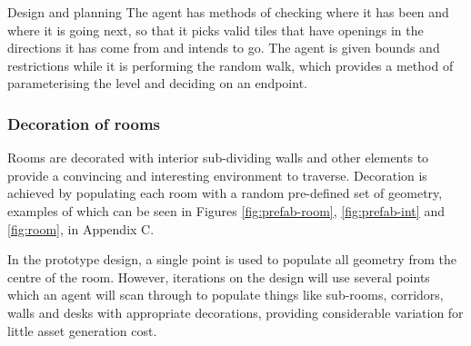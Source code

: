 \documentclass[progress]{cmpreport}
\begin{document}
\begin{section}{Design and planning}
The agent has methods of checking where it has been and where it is going next, so that it picks valid tiles that have openings in the directions it has come from and intends to go. The agent is given bounds and restrictions while it is performing the random walk, which provides a method of parameterising the level and deciding on an endpoint. 

\subsubsection{Decoration of rooms}

Rooms are decorated with interior sub-dividing walls and other elements to provide a convincing and interesting environment to traverse. Decoration is achieved by populating each room with a random pre-defined set of geometry, examples of which can be seen in Figures \ref{fig:prefab-room}, \ref{fig:prefab-int} and \ref{fig:room}, in Appendix C. 

In the prototype design, a single point is used to populate all geometry from the centre of the room. However, iterations on the design will use several points which an agent will scan through to populate things like sub-rooms, corridors, walls and desks with appropriate decorations, providing considerable variation for little asset generation cost.

\end{section}
\end{document}
